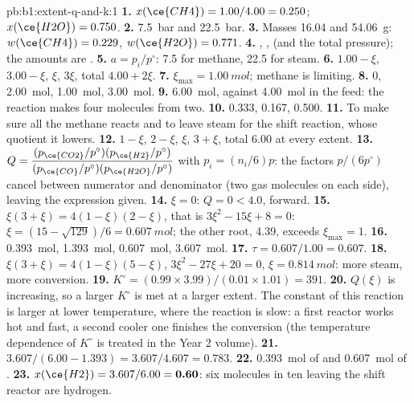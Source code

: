 \begin{solution}{pb:b1:extent-q-and-k:1}
\textbf{1.} $x(\ce{CH4}) = 1.00/4.00 = 0.250$; $x(\ce{H2O}) = 0.750$.
\textbf{2.} \qty{7.5}{bar} and \qty{22.5}{bar}.
\textbf{3.} Masses 16.04 and \qty{54.06}{g}: $w(\ce{CH4}) = 0.229$,
$w(\ce{H2O}) = 0.771$.
\textbf{4.} , ,  (and the
total pressure); the amounts are .
\textbf{5.} $a = p_i/p^\circ$: 7.5 for methane, 22.5 for steam.
\textbf{6.}  $1.00 - \xi$,  $3.00 - \xi$,  $\xi$,
 $3\xi$, total $4.00 + 2\xi$.
\textbf{7.} $\xi_{\max} = \qty{1.00}{mol}$; methane is limiting.
\textbf{8.}  0,  \qty{2.00}{mol},  \qty{1.00}{mol},
 \qty{3.00}{mol}.
\textbf{9.} \qty{6.00}{mol}, against \qty{4.00}{mol} in the feed: the
reaction makes four molecules from two.
\textbf{10.}  0.333,  0.167,  0.500.
\textbf{11.} To make sure all the methane reacts and to leave steam for the
shift reaction, whose quotient it lowers.
\textbf{12.}  $1 - \xi$,  $2 - \xi$,  $\xi$, 
$3 + \xi$, total 6.00 at every extent.
\textbf{13.} $Q = \dfrac{(p_{\ce{CO2}}/p^\circ)(p_{\ce{H2}}/p^\circ)}
{(p_{\ce{CO}}/p^\circ)(p_{\ce{H2O}}/p^\circ)}$ with $p_i = (n_i/6)p$: the
factors $p/(6p^\circ)$ cancel between numerator and denominator (two gas
molecules on each side), leaving the expression given.
\textbf{14.} $\xi = 0$: $Q = 0 < 4.0$, forward.
\textbf{15.} $\xi(3 + \xi) = 4(1 - \xi)(2 - \xi)$, that is $3\xi^2 - 15\xi +
8 = 0$: $\xi = (15 - \sqrt{129})/6 = \qty{0.607}{mol}$; the other root,
4.39, exceeds $\xi_{\max} = 1$.
\textbf{16.}  \qty{0.393}{mol},  \qty{1.393}{mol},
 \qty{0.607}{mol},  \qty{3.607}{mol}.
\textbf{17.} $\tau = 0.607/1.00 = 0.607$.
\textbf{18.} $\xi(3 + \xi) = 4(1 - \xi)(5 - \xi)$, $3\xi^2 - 27\xi + 20 =
0$, $\xi = \qty{0.814}{mol}$: more steam, more conversion.
\textbf{19.} $K^\circ = (0.99 \times 3.99)/(0.01 \times 1.01) = 391$.
\textbf{20.} $Q(\xi)$ is increasing, so a larger $K^\circ$ is met at a
larger extent. The constant of this reaction is larger at lower
temperature, where the reaction is slow: a first reactor works hot and
fast, a second cooler one finishes the conversion (the temperature
dependence of $K^\circ$ is treated in the Year 2 volume).
\textbf{21.} $3.607/(6.00 - 1.393) = 3.607/4.607 = 0.783$.
\textbf{22.} \qty{0.393}{mol} of  and \qty{0.607}{mol} of .
\textbf{23.} $x(\ce{H2}) = 3.607/6.00 = \textbf{0.60}$: six molecules in
ten leaving the shift reactor are hydrogen.
\end{solution}
